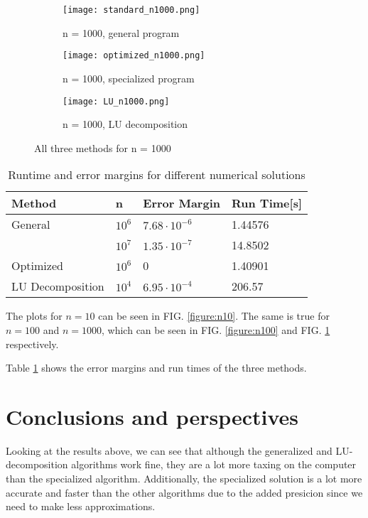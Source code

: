 \documentclass[10pt,showpacs,preprintnumbers,footinbib,amsmath,amssymb,aps,prl,twocolumn,groupedaddress,superscriptaddress,showkeys]{revtex4-1}
\begin{document}
\begin{figure}
	\centering
	\begin{subfigure}[b]{0.4\textwidth}
		\texttt{[image: standard\_n1000.png]}
		\caption{n = 1000, general program}
	\end{subfigure}
    \begin{subfigure}[b]{0.4\textwidth}
		\texttt{[image: optimized\_n1000.png]}
		\caption{n = 1000, specialized program}
	\end{subfigure}
    \begin{subfigure}[b]{0.4\textwidth}
		\texttt{[image: LU\_n1000.png]}
		\caption{n = 1000, LU decomposition}
	\end{subfigure}
    \caption{All three methods for n = 1000}
    \label{figure:n1000}
\end{figure}

\begin{table}[]
\centering
\caption{Runtime and error margins for different numerical solutions}
\begin{tabular}{l|l|l|l}
Method           & n      & Error Margin        & Run Time[s] \\
\hline
General          & $10^6$ & $7.68\cdot10^{-6}$  & 1.44576 \\
			 & $10^7$ & $1.35\cdot10^{-7}$  & 14.8502  \\
Optimized        & $10^6$ & 0                   & 1.40901 \\
LU Decomposition & $10^4$ & $6.95\cdot 10^{-4}$ & 206.57 
\end{tabular}
\label{table:errors}
\end{table}
The plots for $n = 10$ can be seen in FIG. \ref{figure:n10}. The same is true for $n = 100$ and $n = 1000$, which can be seen in FIG. \ref{figure:n100} and FIG. \ref{figure:n1000} respectively.

Table \ref{table:errors} shows the error margins and run times of the three methods.

\section{Conclusions and perspectives}
Looking at the results above, we can see that although the generalized and LU-decomposition algorithms work fine, they are a lot more taxing on the computer than the specialized algorithm. Additionally, the specialized solution is a lot more accurate and faster than the other algorithms due to the added presicion since we need to make less approximations. 
\end{document}
